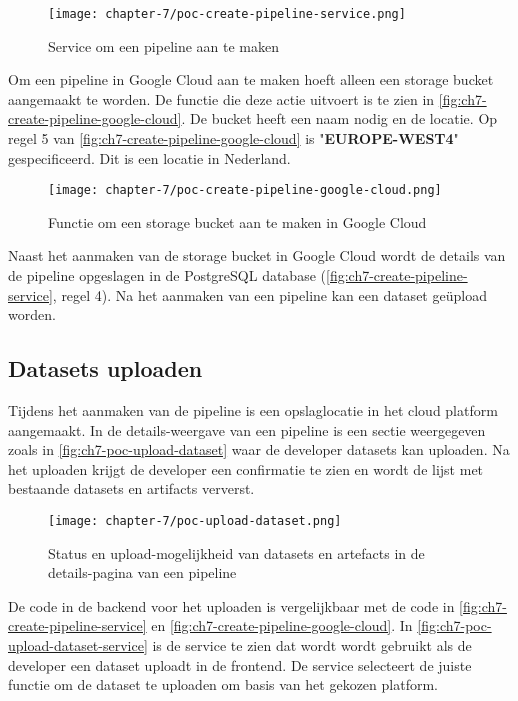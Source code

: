 \newpage

\begin{figure}[hbt!]
  \centering
  \texttt{[image: chapter-7/poc-create-pipeline-service.png]}
  \caption{Service om een pipeline aan te maken}
  \label{fig:ch7-create-pipeline-service}
\end{figure}

Om een pipeline in Google Cloud aan te maken hoeft alleen een storage bucket aangemaakt te worden. De functie die deze actie uitvoert is te zien in \autoref{fig:ch7-create-pipeline-google-cloud}. De bucket heeft een naam nodig en de locatie. Op regel 5 van \autoref{fig:ch7-create-pipeline-google-cloud} is \string"\textbf{EUROPE-WEST4}\string" gespecificeerd. Dit is een locatie in Nederland.

\begin{figure}[hbt!]
  \centering
  \texttt{[image: chapter-7/poc-create-pipeline-google-cloud.png]}
  \caption{Functie om een storage bucket aan te maken in Google Cloud}
  \label{fig:ch7-create-pipeline-google-cloud}
\end{figure}

Naast het aanmaken van de storage bucket in Google Cloud wordt de details van de pipeline opgeslagen in de PostgreSQL database (\autoref{fig:ch7-create-pipeline-service}, regel 4). Na het aanmaken van een pipeline kan een dataset geüpload worden.

\subsection{Datasets uploaden}\label{subsec:ch7-datasets-uploaden}
Tijdens het aanmaken van de pipeline is een opslaglocatie in het cloud platform aangemaakt. In de details-weergave van een pipeline is een sectie weergegeven zoals in \autoref{fig:ch7-poc-upload-dataset} waar de developer datasets kan uploaden. Na het uploaden krijgt de developer een confirmatie te zien en wordt de lijst met bestaande datasets en artifacts ververst.

\newpage

\begin{figure}[hbt!]
  \centering
  \texttt{[image: chapter-7/poc-upload-dataset.png]}
  \caption{Status en upload-mogelijkheid van datasets en artefacts in de details-pagina van een pipeline}
  \label{fig:ch7-poc-upload-dataset}
\end{figure}

De code in de backend voor het uploaden is vergelijkbaar met de code in \autoref{fig:ch7-create-pipeline-service} en \autoref{fig:ch7-create-pipeline-google-cloud}. In \autoref{fig:ch7-poc-upload-dataset-service} is de service te zien dat wordt wordt gebruikt als de developer een dataset uploadt in de frontend. De service selecteert de juiste functie om de dataset te uploaden om basis van het gekozen platform.

